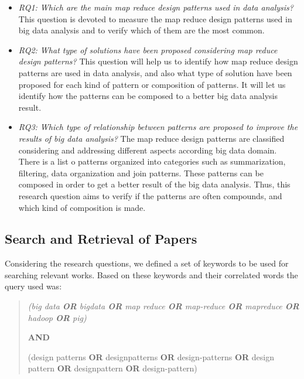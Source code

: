 \begin{itemize}
\item {\em RQ1: Which are the main map reduce design patterns used in data
analysis?} This question is devoted to measure the map reduce design patterns
used in big data analysis and to verify which of them are the most common.

\item {\em RQ2: What type of solutions have been proposed considering map
reduce design patterns?} This question will help us to identify how map reduce
design patterns are used in data analysis, and also
what type of solution have been proposed for each kind of pattern or
composition of patterns. It will let us identify how the patterns can be
composed to a better big data analysis result.
 
\item  {\em RQ3: Which type of relationship between patterns are proposed to
improve the results of big data analysis?} The map reduce design patterns are
classified considering and addressing different aspects
according big data domain. There is a list o patterns organized into categories
such as summarization, filtering, data organization and join patterns. These
patterns can be composed in order to get a better result of the big data
analysis. Thus, this research question aims to verify if the patterns are often
compounds, and which kind of composition is made.


\end{itemize}

\subsection{Search and Retrieval of Papers}

Considering the research questions, we defined a set of keywords to be used for
searching relevant works. Based on these keywords and their
correlated words the query used was:        
 
\begin{quote} \sl
\qquad  (big data \textbf{OR} bigdata \textbf{OR} map reduce \textbf{OR}
map-reduce \textbf{OR} mapreduce \textbf{OR} hadoop \textbf{OR} pig)

\textbf{AND}

\qquad (design patterns \textbf{OR} designpatterns \textbf{OR}
design-patterns \textbf{OR} design pattern
\textbf{OR} designpattern \textbf{OR} design-pattern)
\end{quote}

